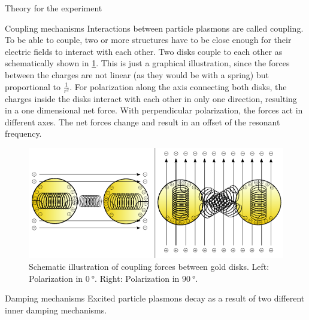 \documentclass[pdftex, a4paper,11pt, twoside, UKenglish]{report}
\begin{document}
\begin{chapter}{Theory for the experiment}
    
    
    \begin{section}{Coupling mechanisms}
      \label{chp:TheoryCoupling}
      Interactions between particle plasmons are called coupling.
      To be able to couple, two or more structures have to be close enough for
      their electric fields to interact with each other. 
      Two disks couple to each other as schematically shown in
      \cref{fig:Coupling}. This is just a graphical illustration, since
      the forces between the charges are not linear (as they would be with a
      spring) but proportional to $\frac{1}{r^{2}}$. For polarization along the
      axis connecting both disks, the charges inside the disks interact with
      each other in only one direction, resulting in a one dimensional net
      force. With perpendicular polarization, the forces act in different
      axes. The net forces change and result in an offset of the resonant
      frequency. 
      \begin{figure}[htbp]
        \centering
        \includegraphics[width=\textwidth]{Figures/Coupling.png}
        \caption{Schematic illustration of coupling forces between gold disks. 
            Left: Polarization in $\SI{0}{\degree}$. 
            Right: Polarization in $\SI{90}{\degree}$. 
            \cite{bib:Theorieteil}}
        \label{fig:Coupling}
      \end{figure}
      
    \end{section}
    
    
    
    \begin{section}{Damping mechanisms}
      \label{chp:TheoryDamping}
      Excited particle plasmons decay as a result of two different inner
      damping mechanisms. 
      

\end{section}
\end{chapter}
\end{document}
